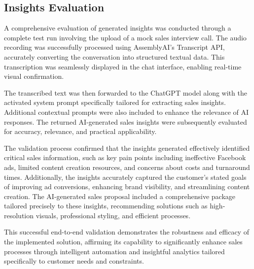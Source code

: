 \subsection{Insights Evaluation}

A comprehensive evaluation of generated insights was conducted through a complete test run involving the upload of a mock sales interview call. The audio recording was successfully processed using AssemblyAI’s Transcript API, accurately converting the conversation into structured textual data. This transcription was seamlessly displayed in the chat interface, enabling real-time visual confirmation.

The transcribed text was then forwarded to the ChatGPT model along with the activated system prompt specifically tailored for extracting sales insights. Additional contextual prompts were also included to enhance the relevance of AI responses. The returned AI-generated sales insights were subsequently evaluated for accuracy, relevance, and practical applicability.

The validation process confirmed that the insights generated effectively identified critical sales information, such as key pain points including ineffective Facebook ads, limited content creation resources, and concerns about costs and turnaround times. Additionally, the insights accurately captured the customer's stated goals of improving ad conversions, enhancing brand visibility, and streamlining content creation. The AI-generated sales proposal included a comprehensive package tailored precisely to these insights, recommending solutions such as high-resolution visuals, professional styling, and efficient processes.

This successful end-to-end validation demonstrates the robustness and efficacy of the implemented solution, affirming its capability to significantly enhance sales processes through intelligent automation and insightful analytics tailored specifically to customer needs and constraints.
